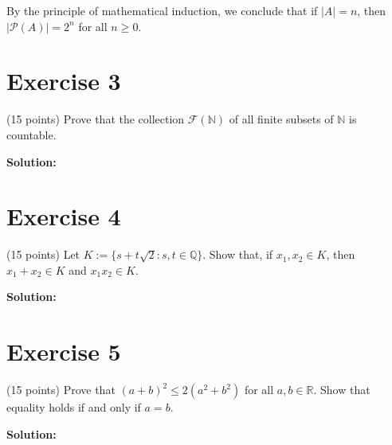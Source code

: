\documentclass{article}
\begin{document}
By the principle of mathematical induction, we conclude that if $|A| = n$, then $|\mathcal{P}(A)| = 2^n$ for all $n \geq 0$.

\newpage

\section*{Exercise 3}
(15 points) Prove that the collection $\mathcal{F}(\mathbb{N})$ of all finite subsets of $\mathbb{N}$ is countable.

\textbf{Solution:}

\newpage

\section*{Exercise 4}
(15 points) Let $K := \{s + t\sqrt{2} : s,t \in \mathbb{Q}\}$. Show that, if $x_1, x_2 \in K$, then $x_1 + x_2 \in K$ and $x_1x_2 \in K$.

\textbf{Solution:}

\newpage

\section*{Exercise 5}
(15 points) Prove that $(a + b)^2 \leq 2(a^2 + b^2)$ for all $a,b \in \mathbb{R}$. Show that equality holds if and only if $a = b$.

\textbf{Solution:}
\end{document}
